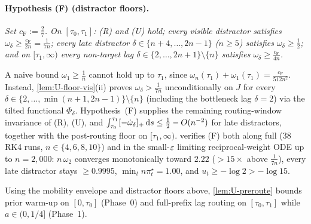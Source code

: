 \paragraph{Hypothesis (F) (distractor floors).}\label{app:hypF}
\emph{Set $c_{\mathrm F} := \frac{2}{7}$. On $[\tau_0, \tau_1]$: (R) and (U) hold; every visible distractor satisfies $\omega_\delta \ge \frac{c_{\mathrm F}}{2n} = \frac{1}{7n}$; every late distractor $\delta \in \{n+4,\ldots,2n-1\}$ ($n \ge 5$) satisfies $\omega_\delta \ge \frac12$; and on $[\tau_1, \infty)$ every non-target lag $\delta \in \{2,\ldots,2n+1\}\setminus\{n\}$ satisfies $\omega_\delta \ge \frac{c_{\mathrm F}}{4n}$.}

A naive bound $\omega_1 \ge \frac{1}{n}$ cannot hold up to $\tau_1$, since $\omega_n(\tau_1) + \omega_1(\tau_1) = \frac{c_{\mathrm F}}{512n^2}$. Instead, \cref{lem:U-floor-vis}(ii) proves $\omega_\delta > \frac{1}{7n}$ unconditionally on $J$ for every $\delta \in \{2,\ldots,\min(n+1, 2n-1)\}\setminus\{n\}$ (including the bottleneck lag $\delta = 2$) via the tilted functional $\Phi_\delta$. Hypothesis~(F) supplies the remaining routing-window invariance of (R), (U), and $\int_{\tau_0}^{\tau_1}[-\dot\omega_\delta]_+\,\mathrm{d} s \le \frac12 - O(n^{-2})$ for late distractors, together with the post-routing floor on $[\tau_1, \infty)$.  verifies (F) both along full \stepode{} ($38$ RK4 runs, $n \in \{4,6,8,10\}$) and in the small-$\varepsilon$ limiting reciprocal-weight ODE up to $n = 2{,}000$: $n\,\omega_2$ converges monotonically toward $2.22$ ($> 15\times$ above $\frac{1}{7n}$), every late distractor stays $\ge 0.9995$, $\min_t n\pi_t^\star = 1.00$, and $u_t \ge -\log 2 > -\log 15$.

Using the mobility envelope and distractor floors above, \cref{lem:U-preroute} bounds prior warm-up on $[0, \tau_0]$ (Phase~0) and full-prefix lag routing on $[\tau_0, \tau_1]$ while $a \in (0, 1/4]$ (Phase~1).

